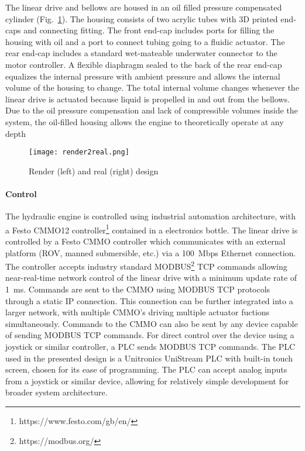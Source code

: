 The linear drive and bellows are housed in an oil filled pressure
compensated cylinder (Fig.~\ref{ch1:fig:housing}). The housing consists of
two acrylic tubes with 3D printed end-caps and connecting fitting. The
front end-cap includes ports for filling the housing with oil and a port
to connect tubing going to a fluidic actuator. The rear end-cap includes
a standard wet-mateable underwater connector to the motor controller. A
flexible diaphragm sealed to the back of the rear end-cap equalizes the
internal pressure with ambient pressure and allows the internal volume
of the housing to change. The total internal volume changes whenever the
linear drive is actuated because liquid is propelled in and out from the
bellows. Due to the oil pressure compensation and lack of compressible
volumes inside the system, the oil-filled housing allows the engine to
theoretically operate at any depth

\begin{figure}
\hypertarget{ch1:fig:housing}{%
\centering
\texttt{[image: render2real.png]}
\caption{Render (left) and real (right) design}\label{ch1:fig:housing}
}
\end{figure}

\hypertarget{ch1:control-1}{%
\paragraph{Control}\label{ch1:control-1}}

The hydraulic engine is controlled using industrial automation
architecture, with a Festo CMMO12 controller\footnote{https://www.festo.com/gb/en/}
contained in a 
electronics bottle. The linear drive is controlled by a Festo CMMO
controller which communicates with an external platform (ROV, manned
submersible, etc.) via a 100~Mbps Ethernet connection. The controller
accepts industry standard MODBUS\footnote{https://modbus.org/} \gls{TCP}
commands allowing near-real-time
network control of the linear drive with a minimum update rate of \SI{1}{\milli\second}.
Commands are sent to the CMMO using MODBUS \gls{TCP} protocols through a
static IP connection. This connection can be further integrated into a
larger network, with multiple CMMO's driving multiple actuator fuctions
simultaneously. Commands to the CMMO can also be sent by any device
capable of sending MODBUS \gls{TCP} commands. For direct control over the
device using a joystick or similar controller, a \gls{PLC} sends MODBUS \gls{TCP} commands. The \gls{PLC} used in the
presented design is a Unitronics UniStream \gls{PLC} with built-in touch
screen, chosen for its ease of programming. The \gls{PLC} can accept analog
inputs from a joystick or similar device, allowing for relatively simple
development for broader system architecture.

